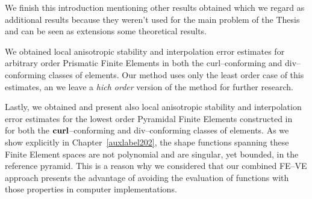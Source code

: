 We finish this introduction mentioning other results obtained which we regard
as additional results because they weren't used
for the main problem
of the Thesis and can be seen as extensions some theoretical results.

We obtained local anisotropic 
stability and
interpolation error estimates for arbitrary order Prismatic Finite Elements in both
the curl–conforming and div–conforming classes of elements. Our method uses only
the least order case of this estimates, an we leave a \emph{hich order} version
of the method for further research.

Lastly, we obtained and present also local anisotropic stability
and interpolation error estimates for the lowest order Pyramidal
Finite Elements constructed in~\cite{gh99, Nigam-2012} for both
the $\textbf{curl}$--conforming and div--conforming classes of elements. As we show
explicitly in Chapter~\ref{auxlabel202}, the shape functions 
spanning these Finite Element spaces are not polynomial and are singular, yet bounded,
in the reference pyramid. This is a reason why we considered that
our combined FE--VE approach presents the advantage of avoiding the evaluation
of functions with those properties in computer implementations.   

